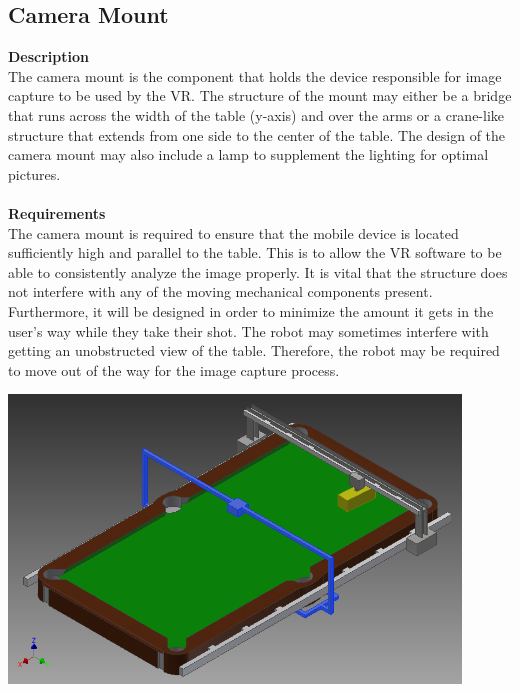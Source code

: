 \documentclass[titlepage]{article}
\begin{document}
\subsection{Camera Mount}
\textbf{Description}\\
The camera mount is the component that holds the device responsible for image capture to be used by the VR. The structure of the mount may either be a bridge that runs across the width of the table (y-axis) and over the arms or a crane-like structure that extends from one side to the center of the table. The design of the camera mount may also include a lamp to supplement the lighting for optimal pictures.\\\\
\textbf{Requirements}\\
The camera mount is required to ensure that the mobile device is located sufficiently high and parallel to the table. This is to allow the VR software to be able to consistently analyze the image properly. It is vital that the structure does not interfere with any of the moving mechanical components present. Furthermore, it will be designed in order to minimize the amount it gets in the user's way while they take their shot. The robot may sometimes interfere with getting an unobstructed view of the table. Therefore, the robot may be required to move out of the way for the image capture process.
\begin{center}
	\includegraphics[width = 0.9\textwidth]{cameraMountYAxis.png}
\label{fig:cameraMount}
\end{center}

\newpage
\end{document}
